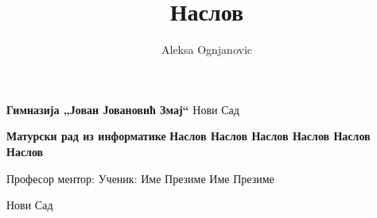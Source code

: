 \documentclass[a4paper]{report}
\title{Наслов}
\author{Aleksa Ognjanovic}
\begin{document}
\thispagestyle{empty}
\begin{center}

    \textbf{\Large Гимназија „Јован Јовановић Змај“}
    \break\break
    {\Large Нови Сад}

    \vfill

    \textbf{\LARGE Матурски рад из информатике}
    \break
    \break
    \textbf{\LARGE Наслов Наслов Наслов Наслов Наслов Наслов}

    \vfill

    {\Large Професор ментор:}
    \hfill
    {\Large Ученик:}
    \break
    \break
    {\Large Име Презиме}
    \hfill
    {\Large Име Презиме}

    \vspace*{64pt}

    {\large Нови Сад}

    \vspace*{24pt}

\end{center}
\end{document}
